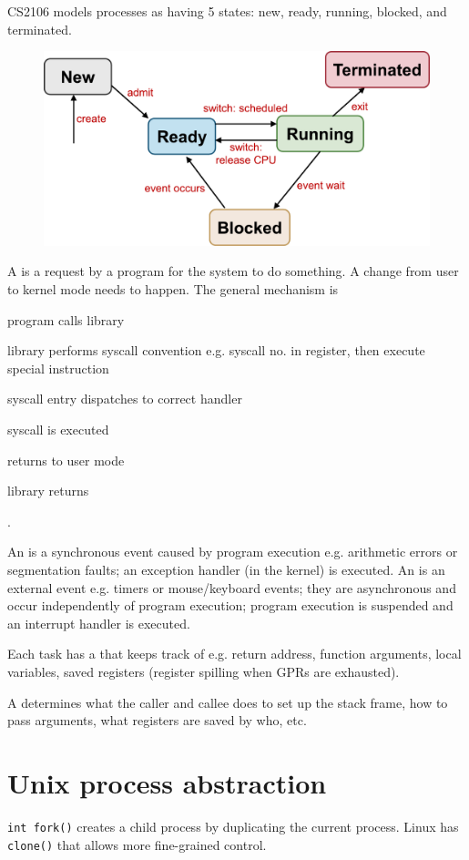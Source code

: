 \documentclass[fontsize=9pt]{slnotes}
\begin{document}
CS2106 models processes as having 5 states: new, ready, running, blocked, and terminated.

\begin{figure}
\includegraphics[width=0.5\columnwidth]{pstates.pdf}
\end{figure}

A  is a request by a program for the system to do something. A change from user to kernel mode needs to happen. The general mechanism is \begin{slinenum}
\item program calls library
\item library performs syscall convention e.g. syscall no. in register, then execute special instruction
\item syscall entry dispatches to correct handler
\item syscall is executed
\item returns to user mode
\item library returns
\end{slinenum}.

An  is a synchronous event caused by program execution e.g. arithmetic errors or segmentation faults; an exception handler (in the kernel) is executed. An  is an external event e.g. timers or mouse/keyboard events; they are asynchronous and occur independently of program execution; program execution is suspended and an interrupt handler is executed.

Each task has a  that keeps track of e.g. return address, function arguments, local variables, saved registers (register spilling when GPRs are exhausted).

A  determines what the caller and callee does to set up the stack frame, how to pass arguments, what registers are saved by who, etc.

\section{Unix process abstraction}
\texttt{int fork()} creates a child process by duplicating the current process. Linux has \texttt{clone()} that allows more fine-grained control.
\end{document}

